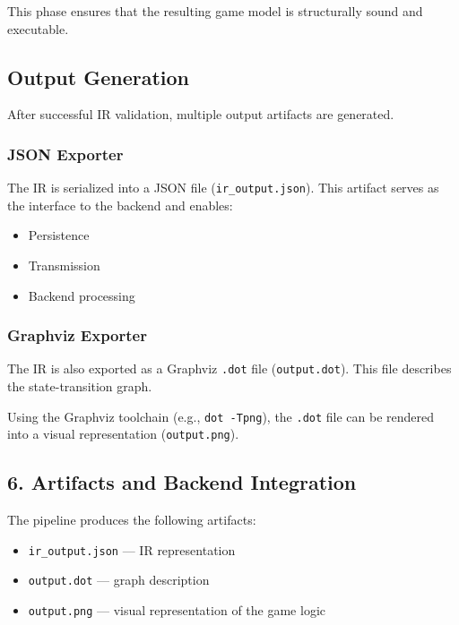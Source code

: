 \documentclass[a4paper,11pt]{article}
\begin{document}
This phase ensures that the resulting game model is structurally sound
and executable.

\subsection{Output Generation}

After successful IR validation, multiple output artifacts are generated.

\subsubsection{JSON Exporter}

The IR is serialized into a JSON file (\texttt{ir\_output.json}).  
This artifact serves as the interface to the backend and enables:

\begin{itemize}
    \item Persistence
    \item Transmission
    \item Backend processing
\end{itemize}

\subsubsection{Graphviz Exporter}

The IR is also exported as a Graphviz \texttt{.dot} file (\texttt{output.dot}).
This file describes the state-transition graph.

Using the Graphviz toolchain (e.g., \texttt{dot -Tpng}), the \texttt{.dot}
file can be rendered into a visual representation (\texttt{output.png}).

\subsection{6. Artifacts and Backend Integration}

The pipeline produces the following artifacts:

\begin{itemize}
    \item \texttt{ir\_output.json} — IR representation
    \item \texttt{output.dot} — graph description
    \item \texttt{output.png} — visual representation of the game logic
\end{itemize}
\end{document}
